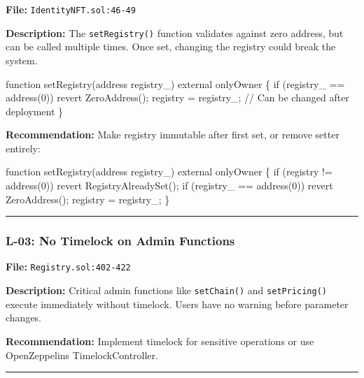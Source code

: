 \documentclass[
]{article}
\newenvironment{Shaded}{}{}
\newcommand{\NormalTok}[1]{#1}
\begin{document}
\textbf{File:} \texttt{IdentityNFT.sol:46-49}

\textbf{Description:} The \texttt{setRegistry()} function validates
against zero address, but can be called multiple times. Once set,
changing the registry could break the system.

\begin{Shaded}
\begin{Highlighting}[]
\NormalTok{function setRegistry(address registry\_) external onlyOwner \{}
\NormalTok{    if (registry\_ == address(0)) revert ZeroAddress();}
\NormalTok{    registry = registry\_;  // Can be changed after deployment}
\NormalTok{\}}
\end{Highlighting}
\end{Shaded}

\textbf{Recommendation:} Make registry immutable after first set, or
remove setter entirely:

\begin{Shaded}
\begin{Highlighting}[]
\NormalTok{function setRegistry(address registry\_) external onlyOwner \{}
\NormalTok{    if (registry != address(0)) revert RegistryAlreadySet();}
\NormalTok{    if (registry\_ == address(0)) revert ZeroAddress();}
\NormalTok{    registry = registry\_;}
\NormalTok{\}}
\end{Highlighting}
\end{Shaded}

\begin{center}\rule{0.5\linewidth}{0.5pt}\end{center}

\subsubsection{L-03: No Timelock on Admin
Functions}\label{l-03-no-timelock-on-admin-functions}

\textbf{File:} \texttt{Registry.sol:402-422}

\textbf{Description:} Critical admin functions like \texttt{setChain()}
and \texttt{setPricing()} execute immediately without timelock. Users
have no warning before parameter changes.

\textbf{Recommendation:} Implement timelock for sensitive operations or
use OpenZeppelin\textquotesingle s TimelockController.

\begin{center}\rule{0.5\linewidth}{0.5pt}\end{center}
\end{document}
